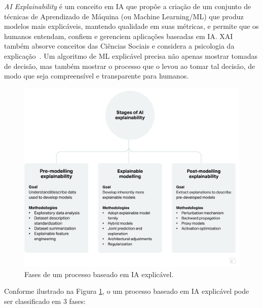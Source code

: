 \documentclass[portugues]{ic-tese}
\begin{document}
\textit{AI Explainability} é um conceito em IA que propõe a criação de um conjunto de técnicas de Aprendizado de Máquina (ou Machine Learning/ML) que produz modelos mais explicáveis, mantendo qualidade em suas métricas, e permite que os humanos entendam, confiem e gerenciem aplicações baseadas em IA. XAI também absorve conceitos das Ciências Sociais e considera a psicologia da explicação~\citep{Arrieta_2020}. Um algoritmo de ML explicável precisa não apenas mostrar tomadas de decisão, mas também mostrar o processo que o levou ao tomar tal decisão, de modo que seja compreensível e transparente para humanos.

\begin{figure}[h]
\centering
\includegraphics[scale=0.2]{images/phases.jpeg}
\caption {Fases de um processo baseado em IA explicável.}
\label{fig:StagesExplainableAI}
\end{figure}

Conforme ilustrado na Figura \ref{fig:StagesExplainableAI}, o um processo baseado em IA explicável pode ser classificado em 3 fases:
\end{document}
